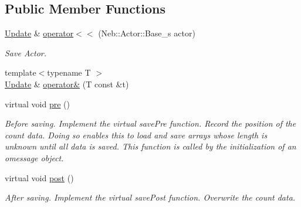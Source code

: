 \subsection*{\-Public \-Member \-Functions}
\begin{DoxyCompactItemize}
\item 
\hypertarget{structNeb_1_1Message_1_1Actor_1_1OUpdate_a4a04c15c17b062b23cd4c7fd52913960}{\hyperlink{structNeb_1_1Message_1_1Actor_1_1Update}{\-Update} \& \hyperlink{structNeb_1_1Message_1_1Actor_1_1OUpdate_a4a04c15c17b062b23cd4c7fd52913960}{operator$<$$<$} (\-Neb\-::\-Actor\-::\-Base\-\_\-s actor)}\label{structNeb_1_1Message_1_1Actor_1_1OUpdate_a4a04c15c17b062b23cd4c7fd52913960}

\begin{DoxyCompactList}\small\item\em \-Save \-Actor. \end{DoxyCompactList}\item 
{\footnotesize template$<$typename T $>$ }\\\hyperlink{structNeb_1_1Message_1_1Actor_1_1Update}{\-Update} \& \hyperlink{structNeb_1_1Message_1_1Actor_1_1OUpdate_a41db1aba7ffab53676915f7ca8036968}{operator\&} (\-T const \&t)
\item 
\hypertarget{structNeb_1_1Message_1_1Actor_1_1OUpdate_ad7b4c3680889ed31f6bcc2db453f61e3}{virtual void \hyperlink{structNeb_1_1Message_1_1Actor_1_1OUpdate_ad7b4c3680889ed31f6bcc2db453f61e3}{pre} ()}\label{structNeb_1_1Message_1_1Actor_1_1OUpdate_ad7b4c3680889ed31f6bcc2db453f61e3}

\begin{DoxyCompactList}\small\item\em \-Before saving. \-Implement the virtual save\-Pre function. \-Record the position of the count data. \-Doing so enables {\ttfamily this} to load and save arrays whose length is unknown until all data is saved. \-This function is called by the initialization of an omessage object. \end{DoxyCompactList}\item 
virtual void \hyperlink{structNeb_1_1Message_1_1Actor_1_1OUpdate_aa972a33a8c8220e7f6194e44c019d817}{post} ()
\begin{DoxyCompactList}\small\item\em \-After saving. \-Implement the virtual save\-Post function. \-Overwrite the count data. \end{DoxyCompactList}\end{DoxyCompactItemize}



